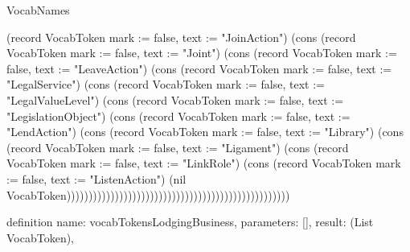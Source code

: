 \begin{lexlean}{VocabNames}
\begin{semanticmodule}
{(record VocabToken {mark := false, text := "JoinAction"}) (cons (record VocabToken {mark := false, text := "Joint"}) (cons (record VocabToken {mark := false, text := "LeaveAction"}) (cons (record VocabToken {mark := false, text := "LegalService"}) (cons (record VocabToken {mark := false, text := "LegalValueLevel"}) (cons (record VocabToken {mark := false, text := "LegislationObject"}) (cons (record VocabToken {mark := false, text := "LendAction"}) (cons (record VocabToken {mark := false, text := "Library"}) (cons (record VocabToken {mark := false, text := "Ligament"}) (cons (record VocabToken {mark := false, text := "LinkRole"}) (cons (record VocabToken {mark := false, text := "ListenAction"}) (nil VocabToken)))))))))))))))))))))))))))))))))))))))))))))))))))
}

definition{
  name: vocabTokensLodgingBusiness,
  parameters: [],
  result: (List VocabToken),
}
\end{semanticmodule}
\end{lexlean}
